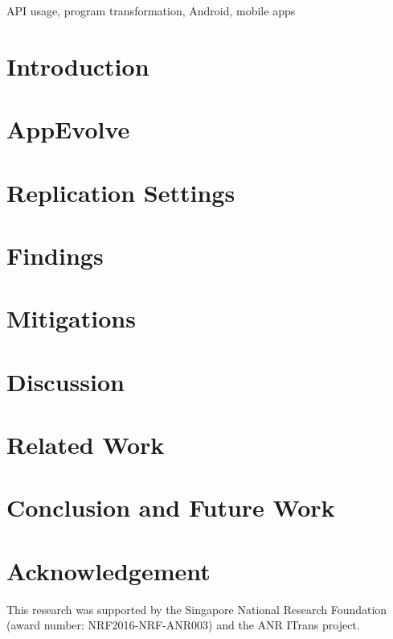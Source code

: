 \documentclass[conference]{IEEEtran}
\begin{document}
\begin{IEEEkeywords}
API usage, program transformation, Android, mobile apps
\end{IEEEkeywords}

\section{Introduction}


\section{AppEvolve}\label{sec:approach}


\section{Replication Settings}\label{sec:replication}


\section{Findings}\label{sec:findings}


\section{Mitigations}\label{sec:mitigations}


\section{Discussion}\label{sec:discuss}


\section{Related Work}\label{sec:related}


\section{Conclusion and Future Work}\label{sec:conclusion}


\section*{Acknowledgement}
This research was supported by the Singapore National Research Foundation (award number: NRF2016-NRF-ANR003) and the ANR ITrans project.





\balance
\end{document}
